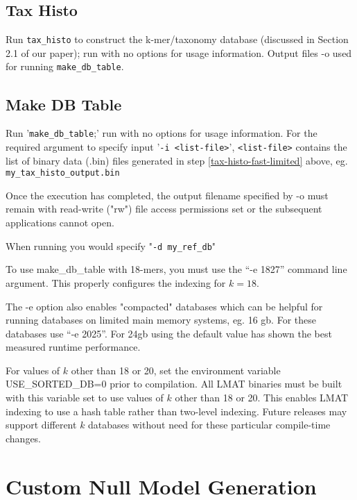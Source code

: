 \documentclass[11pt]{article}
\begin{document}
\subsection{Tax Histo}
\label{tax-histo}
 Run \texttt{tax\_histo} to construct the k-mer/taxonomy database
   (discussed in Section 2.1 of our paper); run with no options for usage
   information. Output files -o used for running \texttt{make\_db\_table}.



\subsection{Make DB Table}
\label{sec:make-db}
Run '\texttt{make\_db\_table};' run with no options for usage information.
   For the required argument to specify input '\texttt{-i <list-file>}', \texttt{<list-file>} contains the list of binary data (.bin) files generated in step \ref{tax-histo-fast-limited} above, eg. \texttt{my\_tax\_histo\_output.bin}

 Once the execution has completed, the output filename specified by -o must remain with read-write ("rw") file access permissions set or the subsequent applications cannot open.

   When running   you would specify "\texttt{-d my\_ref\_db}"  

 
 To use make\_db\_table with 18-mers, you must use the ``-e 1827'' command line argument.  This properly configures the indexing for $k=18$.  

The -e option also enables "compacted" databases which can be helpful for running databases on limited main memory systems, eg. 16 gb. For these databases use ``-e 2025''.   For 24gb using the default value has shown the best measured runtime performance. 

For values of $k$ other than 18 or 20, set the environment variable
 USE_SORTED_DB=0 prior to compilation.  All LMAT binaries must be
 built with this variable set to use values of $k$ other than 18 or
 20.  This enables LMAT indexing to use a hash table rather than two-level indexing.  Future releases may support different $k$ databases without need for
 these particular compile-time changes.


\section{Custom Null Model Generation}
\label{sec:nullmodel}
\end{document}
